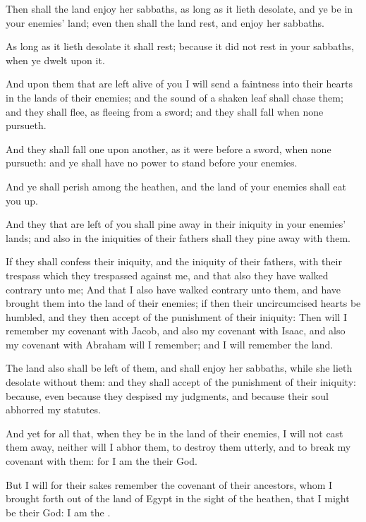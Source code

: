 \Verse Then shall the land enjoy her sabbaths, as long as it lieth desolate, and ye be in your enemies' land; even then shall the land rest, and enjoy her sabbaths.

\Verse As long as it lieth desolate it shall rest; because it did not rest in your sabbaths, when ye dwelt upon it.

\Verse And upon them that are left alive of you I will send a faintness into their hearts in the lands of their enemies; and the sound of a shaken leaf shall chase them; and they shall flee, as fleeing from a sword; and they shall fall when none pursueth.

\Verse And they shall fall one upon another, as it were before a sword, when none pursueth: and ye shall have no power to stand before your enemies.

\Verse And ye shall perish among the heathen, and the land of your enemies shall eat you up.

\Verse And they that are left of you shall pine away in their iniquity in your enemies' lands; and also in the iniquities of their fathers shall they pine away with them.

\Verse If they shall confess their iniquity, and the iniquity of their fathers, with their trespass which they trespassed against me, and that also they have walked contrary unto me; \Verse And that I also have walked contrary unto them, and have brought them into the land of their enemies; if then their uncircumcised hearts be humbled, and they then accept of the punishment of their iniquity: \Verse Then will I remember my covenant with Jacob, and also my covenant with Isaac, and also my covenant with Abraham will I remember; and I will remember the land.

\Verse The land also shall be left of them, and shall enjoy her sabbaths, while she lieth desolate without them: and they shall accept of the punishment of their iniquity: because, even because they despised my judgments, and because their soul abhorred my statutes.

\Verse And yet for all that, when they be in the land of their enemies, I will not cast them away, neither will I abhor them, to destroy them utterly, and to break my covenant with them: for I am the \LORD their God.

\Verse But I will for their sakes remember the covenant of their ancestors, whom I brought forth out of the land of Egypt in the sight of the heathen, that I might be their God: I am the \LORD.

